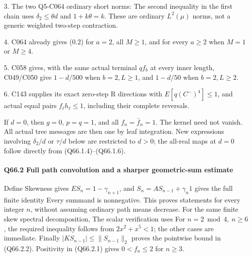 3. The two Q5-C064 ordinary short norms:
   The second inequality in the first chain uses \(\delta_2\le\theta d\) and
   \(1+k\theta=k\). These are ordinary \(L^2(\mu)\) norms, not
   a generic weighted two-step contraction.

4. C064 already gives (0.2) for \(a=2\), all \(M\ge1\),
   and for every \(a\ge2\) when \(M=1\) or \(M\ge4\).

5. C058 gives, with the same actual terminal \(qf_b\)
   at every inner length,
   C049/C050 give \(1-d/500\) when \(b=2,\allowbreak  L\ge1\), and
   \(1-d/50\) when \(b=2,\allowbreak  L\ge2\).

6. C143 supplies its exact zero-step R directions with
   \(E[q(C^-)^4]\le1\), and actual equal pairs
   \(f_\ell h_\ell\le1\), including their complete reversals.

If \(d=0\), then \(g=0\), \(p=q=1\), and all \(f_n=\bar f_n=1\).
The kernel need not vanish. All actual tree messages are then one
by leaf integration. New expressions involving \(\delta_2/d\) or \(\tau/d\)
below are restricted to \(d>0\); the all-real maps at \(d=0\)
follow directly from (Q66.1.4)--(Q66.1.6).

\paragraph{Q66.2 Full path convolution and a sharper geometric-sum estimate}

Define
Skewness gives \(ES_n=1-\gamma_{n+1}\), and
\(S_n=AS_{n-1}+\gamma_n1\) gives the full finite identity
Every summand is nonnegative. This proves statements for every
integer \(n\), without assuming ordinary path means decrease.
For the same finite skew spectral decomposition,
The scalar verification uses
For \(n=2\bmod4,\allowbreak  \ n\ge6\), the required inequality follows from
\(2x^2+x^5<1\); the other cases are immediate. Finally
\(|KS_{n-1}|\le\|S_{n-1}\|_2\) proves the pointwise bound in
(Q66.2.2). Positivity in (Q66.2.1) gives \(0<f_n\le2\) for \(n\ge3\).

